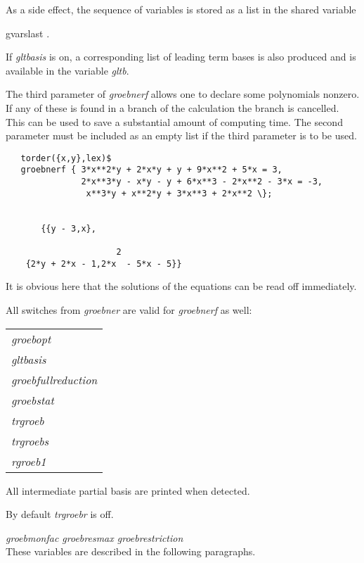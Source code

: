 As a side effect, the sequence of variables is stored as a \REDUCE list in
the shared variable
\begin{center}
gvarslast .
\end{center}
If \emph{gltbasis} is on, a corresponding list of leading term bases is
also produced and is available in the variable \emph{gltb}.

The third parameter of \emph{groebnerf} allows one to declare some polynomials
nonzero. If any of these is found in a branch of the calculation
the branch is cancelled. This can be used to save a substantial amount
of computing time. The second parameter must be included as an
empty list if the third parameter is to be used.

\begin{verbatim}
   torder({x,y},lex)$
   groebnerf { 3*x**2*y + 2*x*y + y + 9*x**2 + 5*x = 3,
               2*x**3*y - x*y - y + 6*x**3 - 2*x**2 - 3*x = -3,
                x**3*y + x**2*y + 3*x**3 + 2*x**2 \};


       {{y - 3,x},

                      2
    {2*y + 2*x - 1,2*x  - 5*x - 5}}
\end{verbatim}

It is obvious here that the solutions of the equations can be read
off immediately.

All switches from \emph{groebner} are valid for \emph{groebnerf} as well:
\begin{center}
\begin{tabular}{l}
\emph{groebopt} \\
\emph{gltbasis} \\
\emph{groebfullreduction} \\
\emph{groebstat} \\
\emph{trgroeb} \\
\emph{trgroebs} \\
\emph{rgroeb1}
\end{tabular}
\end{center}

\begin{description}

\item[\emph{trgroebr} --] All intermediate partial basis are printed when
detected.

By default \emph{trgroebr} is off.
\end{description}
{\it groebmonfac  groebresmax  groebrestriction} \\
\hspace*{.5cm} These variables are described in the following
paragraphs.

